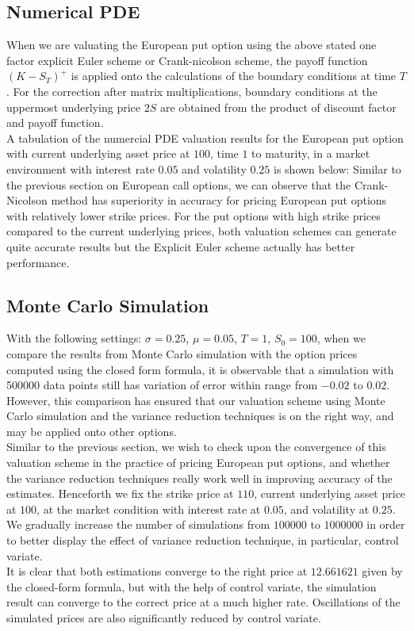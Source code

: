\subsection*{Numerical PDE}
When we are valuating the European put option using the above stated one factor explicit Euler scheme or Crank-nicolson scheme, the payoff function $(K - S_{T})^{+}$ is applied onto the calculations of the boundary conditions at time $T$. For the correction after matrix multiplications, boundary conditions at the uppermost underlying price $2S$ are obtained from the product of discount factor and payoff function.\\[1mm]
A tabulation of the numercial PDE valuation results for the European put option with current underlying asset price at $100$, time $1$ to maturity, in a market environment with interest rate $0.05$ and volatility $0.25$ is shown below:
Similar to the previous section on European call options, we can observe that the Crank-Nicolson method has superiority in accuracy for pricing European put options with relatively lower strike prices. For the put options with high strike prices compared to the current underlying prices, both valuation schemes can generate quite accurate results but the Explicit Euler scheme actually has better performance.

\subsection*{Monte Carlo Simulation}
With the following settings: $\sigma = 0.25$, $\mu = 0.05$, $T = 1$, $S_{0} = 100$, 
when we compare the results from Monte Carlo simulation with the option prices computed using the closed form formula, it is observable that a simulation with 500000 data points still has variation of error within range from $-0.02$ to $0.02$. However, this comparison has ensured that our valuation scheme using Monte Carlo simulation and the variance reduction techniques is on the right way, and may be applied onto other options.\\
Similar to the previous section, we wish to check upon the convergence of this valuation scheme in the practice of pricing European put options, and whether the variance reduction techniques really work well in improving accuracy of the estimates. Henceforth we fix the strike price at $110$, current underlying asset price at $100$, at the market condition with interest rate at $0.05$, and volatility at $0.25$. We gradually increase the number of simulations from $100000$ to $1000000$ in order to better display the effect of variance reduction technique, in particular, control variate.
\\
It is clear that both estimations converge to the right price at $12.661621$ given by the closed-form formula, but with the help of control variate, the simulation result can converge to the correct price at a much higher rate. Oscillations of the simulated prices are also significantly reduced by control variate.


